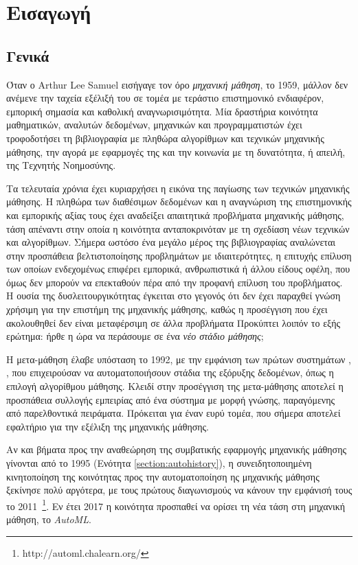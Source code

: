 \chapter{Εισαγωγή}
\section{Γενικά}
Όταν ο Arthur Lee Samuel εισήγαγε τον όρο \textit{μηχανική μάθηση}, το 1959, μάλλον δεν ανέμενε την ταχεία εξέλιξή του σε τομέα με τεράστιο επιστημονικό ενδιαφέρον, εμπορική σημασία και καθολική αναγνωρισιμότητα. Μία δραστήρια κοινότητα μαθηματικών, αναλυτών δεδομένων, μηχανικών και προγραμματιστών έχει τροφοδοτήσει τη βιβλιογραφία με πληθώρα αλγορίθμων και τεχνικών μηχανικής μάθησης, την αγορά με εφαρμογές της και την κοινωνία με τη δυνατότητα, ή απειλή, της Τεχνητής Νοημοσύνης.

Τα τελευταία χρόνια έχει κυριαρχήσει η εικόνα της παγίωσης των τεχνικών μηχανικής μάθησης. Η πληθώρα των διαθέσιμων δεδομένων και η αναγνώριση της επιστημονικής και εμπορικής αξίας τους έχει αναδείξει απαιτητικά προβλήματα μηχανικής μάθησης, τάση απέναντι στην οποία η κοινότητα ανταποκρινόταν με τη σχεδίαση νέων τεχνικών και αλγορίθμων. Σήμερα ωστόσο ένα μεγάλο μέρος της βιβλιογραφίας αναλώνεται στην προσπάθεια βελτιστοποίησης προβλημάτων με ιδιαιτερότητες, η επιτυχής επίλυση των οποίων ενδεχομένως επιφέρει εμπορικά, ανθρωπιστικά ή άλλου είδους οφέλη, που όμως δεν μπορούν να επεκταθούν πέρα από την προφανή επίλυση του προβλήματος. Η ουσία της δυσλειτουργικότητας έγκειται στο γεγονός ότι δεν έχει παραχθεί γνώση χρήσιμη για την επιστήμη της μηχανικής μάθησης, καθώς η προσέγγιση που έχει ακολουθηθεί δεν είναι μεταφέρσιμη σε άλλα προβλήματα Προκύπτει λοιπόν το εξής ερώτημα: ήρθε η ώρα να περάσουμε σε ένα \textit{νέο στάδιο μάθησης};

Η μετα-μάθηση έλαβε υπόσταση το 1992, με την εμφάνιση των πρώτων συστημάτων \citep{craw1993,Brazdil1994}, , που επιχειρούσαν να αυτοματοποιήσουν στάδια της εξόρυξης δεδομένων, όπως η επιλογή αλγορίθμου μάθησης. Κλειδί στην προσέγγιση της μετα-μάθησης αποτελεί η προσπάθεια συλλογής εμπειρίας από ένα σύστημα με μορφή γνώσης, παραγόμενης από παρελθοντικά πειράματα. Πρόκειται για έναν ευρύ τομέα, που σήμερα αποτελεί εφαλτήριο για την εξέλιξη της μηχανικής μάθησης.


Αν και βήματα προς την αναθεώρηση της συμβατικής εφαρμογής μηχανικής μάθησης γίνονται από το 1995 (Ενότητα \ref{section:autohistory}), η συνειδητοποιημένη κινητοποίηση της κοινότητας προς την αυτοματοποίηση ης μηχανικής μάθησης ξεκίνησε πολύ αργότερα, με τους πρώτους διαγωνισμούς να κάνουν την εμφάνισή τους το 2011~\footnote{http://automl.chalearn.org/}. Εν έτει 2017 η κοινότητα προσπαθεί να ορίσει τη νέα τάση στη μηχανική μάθηση, το \textit{AutoML}.

